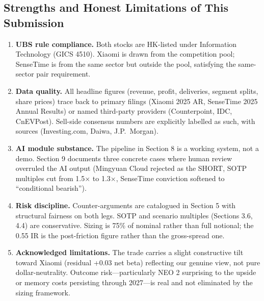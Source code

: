 \documentclass[11pt,a4paper]{article}
\begin{document}
\subsection{Strengths and Honest Limitations of This Submission}
\begin{enumerate}
\item \textbf{UBS rule compliance.} Both stocks are HK-listed under Information Technology (GICS 4510). Xiaomi is drawn from the competition pool; SenseTime is from the same sector but outside the pool, satisfying the same-sector pair requirement.
\item \textbf{Data quality.} All headline figures (revenue, profit, deliveries, segment splits, share prices) trace back to primary filings (Xiaomi 2025 AR, SenseTime 2025 Annual Results) or named third-party providers (Counterpoint, IDC, CnEVPost). Sell-side consensus numbers are explicitly labelled as such, with sources (Investing.com, Daiwa, J.P.\ Morgan).
\item \textbf{AI module substance.} The pipeline in Section 8 is a working system, not a demo. Section 9 documents three concrete cases where human review overruled the AI output (Mingyuan Cloud rejected as the SHORT, SOTP multiples cut from 1.5$\times$ to 1.3$\times$, SenseTime conviction softened to ``conditional bearish'').
\item \textbf{Risk discipline.} Counter-arguments are catalogued in Section 5 with structural fairness on both legs. SOTP and scenario multiples (Sections 3.6, 4.4) are conservative. Sizing is 75\% of nominal rather than full notional; the 0.55 IR is the post-friction figure rather than the gross-spread one.
\item \textbf{Acknowledged limitations.} The trade carries a slight constructive tilt toward Xiaomi (residual +0.03 net beta) reflecting our genuine view, not pure dollar-neutrality. Outcome risk---particularly NEO 2 surprising to the upside or memory costs persisting through 2027---is real and not eliminated by the sizing framework.
\end{enumerate}

\vspace{0.4cm}

\begin{center}
\end{center}
\end{document}
